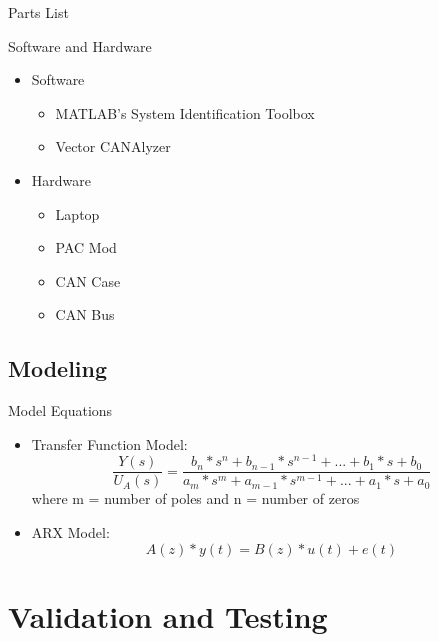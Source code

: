 \documentclass{beamer}
\begin{document}
\begin{frame}{Parts List}
  \begin{block}{Software and Hardware}
 \begin{itemize}
        \item Software
        \begin{itemize}
        \small
        \item MATLAB's System Identification Toolbox
        \item Vector CANAlyzer
        \end{itemize}
	\item Hardware
	\begin{itemize}
	\small
	\item Laptop
	\item PAC Mod
	\item CAN Case 
	\item CAN Bus
	\end{itemize}
\end{itemize}
  \end{block}
\end{frame}

\subsection{Modeling}

\begin{frame}{Model Equations}
	\begin{block}{}
		\begin{itemize}
			\item Transfer Function Model: 
			\begin{equation}
				\frac{Y(s)}{U_A(s)} = \frac{b_{n}*s^{n} + b_{n-1}*s^{n-1} + ... + b_1*s + b_0}{a_{m}*s^{m} + a_{m-1}*s^{m-1} + ... + a_1*s + a_0}
			\end{equation}
			where m = number of poles and n = number of zeros
			\item ARX Model: 
			\begin{equation}
				A(z)*y(t) = B(z)*u(t) + e(t)
			\end{equation}
		\end{itemize}
	\end{block}
\end{frame}

\section{Validation and Testing}
\end{document}
